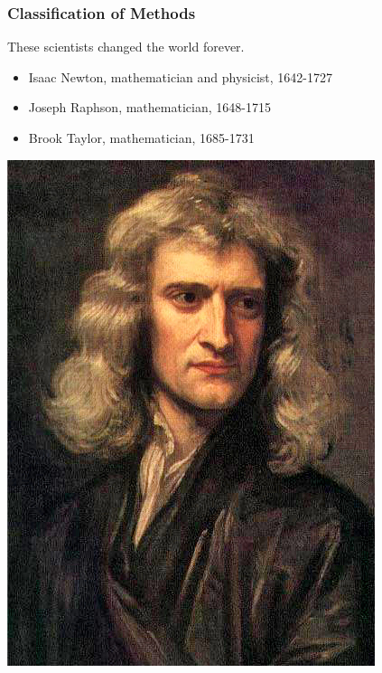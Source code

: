 \documentclass[fleqn]{beamer} %
\newcommand{\sectionIIsubsectionItitle}{Classification of Methods}
\begin{document}
			\begin{frame}[label=sectionIIsubsectionI]
				\frametitle{\sectionIIsubsectionItitle}
				\bigskip

				These scientists changed the world forever.

				\begin{itemize}
					\item Isaac Newton, mathematician and physicist, 1642-1727
					\item Joseph Raphson, mathematician, 1648-1715 \\
					\item Brook Taylor, mathematician, 1685-1731 \\
				\end{itemize}

				\includegraphics[scale=.17]{images/newton_portrait.jpg}

\end{frame}
\end{document}
